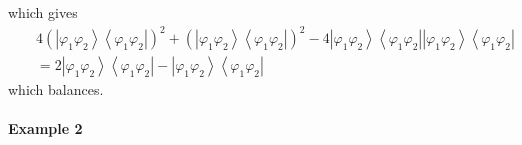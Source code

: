 \documentclass[12pt]{article}
\begin{document}
which gives%
\begin{eqnarray*}
&&4\left( \left\vert \varphi _{1}\varphi _{2}\right\rangle \left\langle
\varphi _{1}\varphi _{2}\right\vert \right) ^{2}+\left( \left\vert \varphi
_{1}\varphi _{2}\right\rangle \left\langle \varphi _{1}\varphi
_{2}\right\vert \right) ^{2}-4\left\vert \varphi _{1}\varphi
_{2}\right\rangle \left\langle \varphi _{1}\varphi _{2}\right\vert
\left\vert \varphi _{1}\varphi _{2}\right\rangle \left\langle \varphi
_{1}\varphi _{2}\right\vert \\
&&\left. =2\right. \left\vert \varphi _{1}\varphi _{2}\right\rangle
\left\langle \varphi _{1}\varphi _{2}\right\vert -\left\vert \varphi
_{1}\varphi _{2}\right\rangle \left\langle \varphi _{1}\varphi
_{2}\right\vert
\end{eqnarray*}%
which balances.

\paragraph{Example 2}
\end{document}
